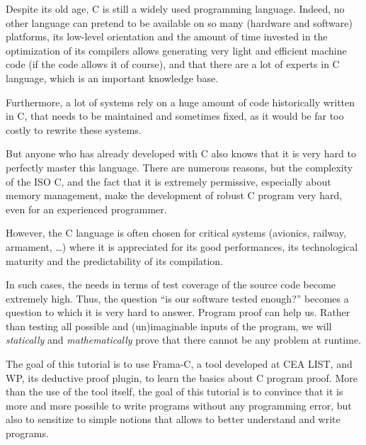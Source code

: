 \newpage

Despite its old age, C is still a widely used programming language.
Indeed, no other language can pretend to be available on so many
(hardware and software) platforms, its low-level orientation
and the amount of time invested in the optimization of its compilers
allows generating very light and efficient machine code (if the code
allows it of course), and that there are a lot of experts in C language,
which is an important knowledge base.


Furthermore, a lot of systems rely on a huge amount of code historically
written in C, that needs to be maintained and sometimes fixed, as it
would be far too costly to rewrite these systems.


But anyone who has already developed with C also knows that it is very
hard to perfectly master this language. There are numerous reasons, but
the complexity of the ISO C, and the fact that it is extremely permissive,
especially about memory management, make the development of robust C
program very hard, even for an experienced programmer.



However, the C language is often chosen for critical systems (avionics,
railway, armament, \ldots{}) where it is appreciated for its good
performances, its technological maturity and the predictability of its
compilation.



In such cases, the needs in terms of test coverage of the source code
become extremely high. Thus, the question ``is our software tested
enough?'' becomes a question to which it is very hard to answer. Program
proof can help us.
Rather than testing all possible and (un)imaginable inputs of the program,
we will \emph{statically} and \emph{mathematically} prove that there
cannot be any problem at runtime.



The goal of this tutorial is to use Frama-C, a tool developed at CEA
LIST, and WP, its deductive proof plugin, to learn the basics about C
program proof. More than the use of the tool itself, the goal of this
tutorial is to convince that it is more and more possible to write
programs without any programming error, but also to sensitize to simple
notions that allows to better understand and write programs.



